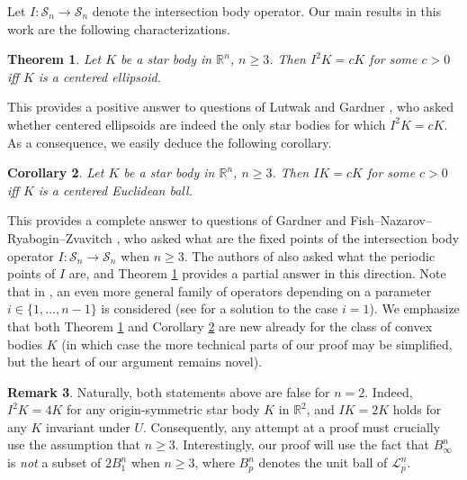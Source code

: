 \documentclass[11pt]{article}
\newtheorem{thm}{Theorem}[section]
\newtheorem{cor}[thm]{Corollary}
\theoremstyle{definition}
\newtheorem{rem}[thm]{\textbf{Remark}}
\theoremstyle{proof}
\DeclareMathOperator{\+}{\mathop{\tilde{+}}}
\newcommand{\R}{\mathbb{R}}
\newcommand{\J}{L}
\renewcommand{\L}{\mathscr{L}}  \newcommand{\U}{U}\renewcommand{\J}{\mathcal{J}}
\renewcommand{\SS}{\mathcal{S}}
\numberwithin{equation}{section}
\numberwithin{equation}{section}
\begin{document}
\medskip
 
Let  $I : \SS_n \rightarrow \SS_n$ denote the intersection body operator. Our main results in this work are the following characterizations.

\begin{thm} \label{thm:intro-main}
Let $K$ be a star body in $\R^n$, $n \geq 3$. Then $I^2 K = c K$ for some $c > 0$ iff $K$ is a centered ellipsoid. 
\end{thm}
This provides a positive answer to questions of Lutwak \cite[Open Problem 12.8]{Lutwak-Selected} and Gardner \cite[Open Problem 8.6, Case $i=n-1$]{GardnerGeometricTomography2ndEd}, who asked whether centered ellipsoids are indeed the only star bodies for which $I^2 K = c K$. As a consequence, we easily deduce
the following corollary. 
\begin{cor} \label{cor:intro-main}
Let $K$ be a star body in $\R^n$, $n \geq 3$. Then $I K = c K$ for some $c > 0$ iff $K$ is a centered Euclidean ball. 
\end{cor}
This provides a complete answer to questions of Gardner \cite[Open Problem 8.7, Case $i=n-1$]{GardnerGeometricTomography2ndEd} and Fish--Nazarov--Ryabogin--Zvavitch \cite[Question]{FNRZ-IntersectionBodyOperator}, who asked what are the fixed points of the intersection body operator $I : \SS_n \rightarrow \SS_n$ when $n \geq 3$. The authors of \cite{FNRZ-IntersectionBodyOperator} also asked what the periodic points of $I$ are, and Theorem \ref{thm:intro-main} provides a partial answer in this direction. Note that in \cite[Open Problems 8.6-8.7]{GardnerGeometricTomography2ndEd}, an even more general family of operators depending on a parameter $i \in \{1,\ldots,n-1\}$ is considered (see \cite[Corollary 9.8]{Grinberg-Zhang} for a solution to the case $i=1$). 
We emphasize that both Theorem \ref{thm:intro-main} and Corollary \ref{cor:intro-main} are new already for the class of convex bodies $K$ (in which case the more technical parts of our proof may be simplified, but the heart of our argument remains novel). 

\begin{rem}
Naturally, both statements above are false for $n=2$. Indeed, $I^2 K = 4 K$ for any origin-symmetric star body $K$ in $\R^2$, and $I K = 2 K$ holds for any $K$ invariant under $U$. Consequently, any attempt at a proof must crucially use the assumption that $n \geq 3$. Interestingly, our proof will use the fact that $B_\infty^n$ is \emph{not} a subset of $2 B_1^n$ when $n \geq 3$, where $B_p^n$ denotes the unit ball of $\L_p^n$. \end{rem}
\end{document}

